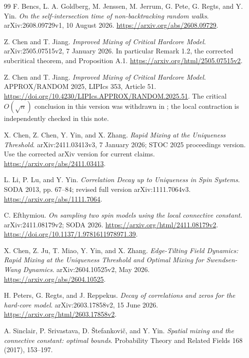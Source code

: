 \documentclass[11pt]{article}
\theoremstyle{definition}
\begin{document}
\begingroup
\small
\setlength{\parskip}{0pt}
\begin{thebibliography}{99}
\setlength{\itemsep}{4pt}
F. Bencs, L. A. Goldberg, M. Jenssen, M. Jerrum, G. Pete, G. Regts,
and Y. Yin.
\emph{On the self-intersection time of non-backtracking random walks}.
arXiv:2608.09729v1, 10 August 2026.
\url{https://arxiv.org/abs/2608.09729}.

Z. Chen and T. Jiang.
\emph{Improved Mixing of Critical Hardcore Model}.
arXiv:2505.07515v2, 7 January 2026. In particular Remark 1.2,
the corrected subcritical theorem, and Proposition A.1.
\url{https://arxiv.org/html/2505.07515v2}.

Z. Chen and T. Jiang.
\emph{Improved Mixing of Critical Hardcore Model}.
APPROX/RANDOM 2025, LIPIcs 353, Article 51.
\url{https://doi.org/10.4230/LIPIcs.APPROX/RANDOM.2025.51}.
The critical $O(\sqrt n)$ conclusion in this version was withdrawn in
\cite{CJ26}; the local contraction is independently checked in this note.

X. Chen, Z. Chen, Y. Yin, and X. Zhang.
\emph{Rapid Mixing at the Uniqueness Threshold}.
arXiv:2411.03413v3, 7 January 2026; STOC 2025 proceedings version.
Use the corrected arXiv version for current claims.
\url{https://arxiv.org/abs/2411.03413}.

L. Li, P. Lu, and Y. Yin.
\emph{Correlation Decay up to Uniqueness in Spin Systems}.
SODA 2013, pp. 67--84; revised full version arXiv:1111.7064v3.
\url{https://arxiv.org/abs/1111.7064}.

C. Efthymiou.
\emph{On sampling two spin models using the local connective constant}.
arXiv:2411.08179v2; SODA 2026.
\url{https://arxiv.org/html/2411.08179v2}.
\url{https://doi.org/10.1137/1.9781611978971.39}.

X. Chen, Z. Ju, T. Miao, Y. Yin, and X. Zhang.
\emph{Edge-Tilting Field Dynamics: Rapid Mixing at the Uniqueness
Threshold and Optimal Mixing for Swendsen-Wang Dynamics}.
arXiv:2604.10525v2, May 2026.
\url{https://arxiv.org/abs/2604.10525}.

H. Peters, G. Regts, and J. Reppekus.
\emph{Decay of correlations and zeros for the hard-core model}.
arXiv:2603.17858v2, 15 June 2026.
\url{https://arxiv.org/html/2603.17858v2}.

A. Sinclair, P. Srivastava, D. \v{S}tefankovi\v{c}, and Y. Yin.
\emph{Spatial mixing and the connective constant: optimal bounds}.
Probability Theory and Related Fields 168 (2017), 153--197.


\end{thebibliography}
\end{document}
